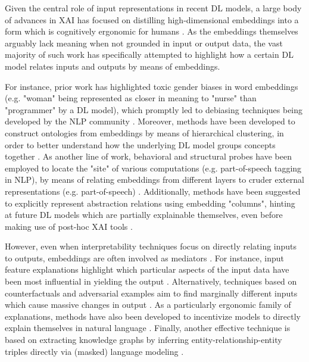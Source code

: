 Given the central role of input representations in recent DL models, a large body of advances in XAI has focused on distilling high-dimensional embeddings into a form which is cognitively ergonomic for humans \citep{madsen_post-hoc_2021}. As the embeddings themselves arguably lack meaning when not grounded in input or output data, the vast majority of such work has specifically attempted to highlight how a certain DL model relates inputs and outputs by means of embeddings.

For instance, prior work has highlighted toxic gender biases in word embeddings (e.g. "woman" being represented as closer in meaning to "nurse" than "programmer" by a DL model), which promptly led to debiasing techniques being developed by the NLP community \citep{bolukbasi_man_2016}. Moreover, methods have been developed to construct ontologies from embeddings by means of hierarchical clustering, in order to better understand how the underlying DL model groups concepts together \citep{liu_interpretation_2018}. As another line of work, behavioral and structural probes have been employed to locate the "site" of various computations (e.g. part-of-speech tagging in NLP), by means of relating embeddings from different layers to cruder external representations (e.g. part-of-speech) \citep{tenney_bert_2019}. Additionally, methods have been suggested to explicitly represent abstraction relations using embedding "columns", hinting at future DL models which are partially explainable themselves, even before making use of post-hoc XAI tools \citep{hinton_how_2021}.

However, even when interpretability techniques focus on directly relating inputs to outputs, embeddings are often involved as mediators \citep{danilevsky_survey_nodate}. For instance, input feature explanations highlight which particular aspects of the input data have been most influential in yielding the output \citep{jain_attention_nodate}. Alternatively, techniques based on counterfactuals and adversarial examples aim to find marginally different inputs which cause massive changes in output \citep{madsen_post-hoc_2021}. As a particularly ergonomic family of explanations, methods have also been developed to incentivize models to directly explain themselves in natural language \citep{madsen_post-hoc_2021}. Finally, another effective technique is based on extracting knowledge graphs by inferring entity-relationship-entity triples directly via (masked) language modeling \citep{wang_language_2020}.

